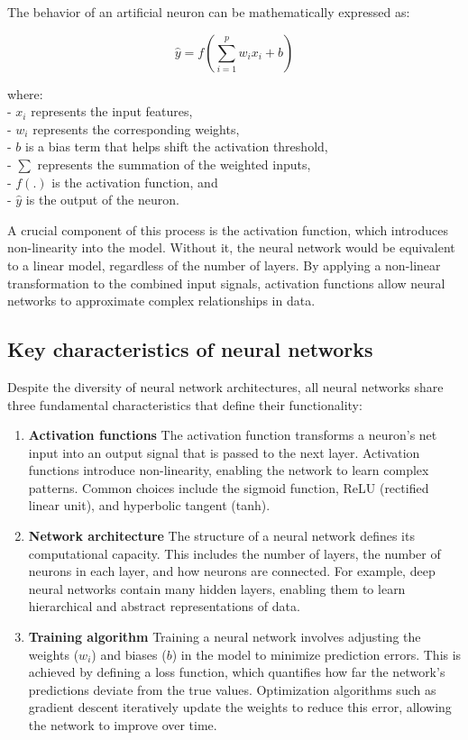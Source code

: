\documentclass[
  11pt,
]{book}
\theoremstyle{definition}
\theoremstyle{definition}
\theoremstyle{definition}
\theoremstyle{definition}
\theoremstyle{remark}
\begin{document}
The behavior of an artificial neuron can be mathematically expressed as:

\[
\hat{y} = f\left( \sum_{i=1}^{p} w_i x_i + b \right)
\]

where:\\
- \(x_i\) represents the input features,\\
- \(w_i\) represents the corresponding weights,\\
- \(b\) is a bias term that helps shift the activation threshold,\\
- \(\sum\) represents the summation of the weighted inputs,\\
- \(f(.)\) is the activation function, and\\
- \(\hat{y}\) is the output of the neuron.

A crucial component of this process is the activation function, which introduces non-linearity into the model. Without it, the neural network would be equivalent to a linear model, regardless of the number of layers. By applying a non-linear transformation to the combined input signals, activation functions allow neural networks to approximate complex relationships in data.

\subsection*{Key characteristics of neural networks}\label{key-characteristics-of-neural-networks}


Despite the diversity of neural network architectures, all neural networks share three fundamental characteristics that define their functionality:

\begin{enumerate}
\def\labelenumi{\arabic{enumi}.}
\item
  \textbf{Activation functions} The activation function transforms a neuron's net input into an output signal that is passed to the next layer. Activation functions introduce non-linearity, enabling the network to learn complex patterns. Common choices include the sigmoid function, ReLU (rectified linear unit), and hyperbolic tangent (tanh).
\item
  \textbf{Network architecture} The structure of a neural network defines its computational capacity. This includes the number of layers, the number of neurons in each layer, and how neurons are connected. For example, deep neural networks contain many hidden layers, enabling them to learn hierarchical and abstract representations of data.
\item
  \textbf{Training algorithm} Training a neural network involves adjusting the weights (\(w_i\)) and biases (\(b\)) in the model to minimize prediction errors. This is achieved by defining a loss function, which quantifies how far the network's predictions deviate from the true values. Optimization algorithms such as gradient descent iteratively update the weights to reduce this error, allowing the network to improve over time.
\end{enumerate}
\end{document}
